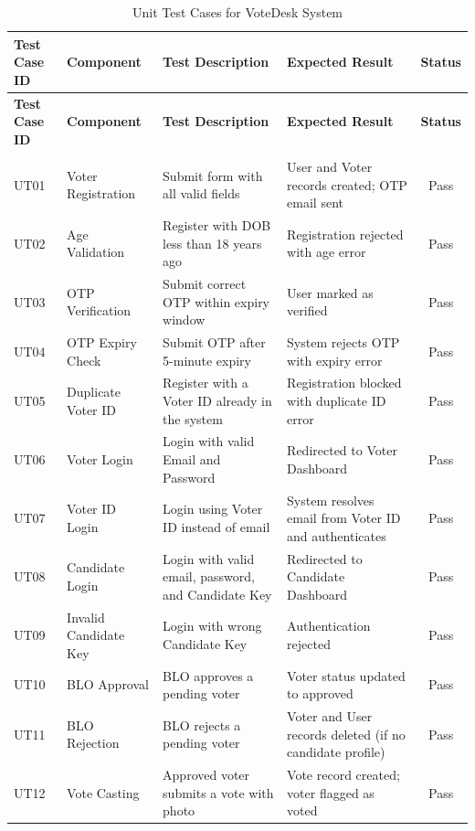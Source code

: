 \begin{longtable}{|p{1.5cm}|p{2.5cm}|p{4cm}|p{4cm}|c|}
\hline
\textbf{Test Case ID} & \textbf{Component} & \textbf{Test Description} & \textbf{Expected Result} & \textbf{Status} \\
\hline
\endfirsthead

\hline
\textbf{Test Case ID} & \textbf{Component} & \textbf{Test Description} & \textbf{Expected Result} & \textbf{Status} \\
\hline
\endhead

\hline
\caption{Unit Test Cases for VoteDesk System} \label{tab:unit_tests} \\
\endlastfoot

UT01 & Voter Registration & Submit form with all valid fields & User and Voter records created; OTP email sent & Pass \\
\hline
UT02 & Age Validation & Register with DOB less than 18 years ago & Registration rejected with age error & Pass \\
\hline
UT03 & OTP Verification & Submit correct OTP within expiry window & User marked as verified & Pass \\
\hline
UT04 & OTP Expiry Check & Submit OTP after 5-minute expiry & System rejects OTP with expiry error & Pass \\
\hline
UT05 & Duplicate Voter ID & Register with a Voter ID already in the system & Registration blocked with duplicate ID error & Pass \\
\hline
UT06 & Voter Login & Login with valid Email and Password & Redirected to Voter Dashboard & Pass \\
\hline
UT07 & Voter ID Login & Login using Voter ID instead of email & System resolves email from Voter ID and authenticates & Pass \\
\hline
UT08 & Candidate Login & Login with valid email, password, and Candidate Key & Redirected to Candidate Dashboard & Pass \\
\hline
UT09 & Invalid Candidate Key & Login with wrong Candidate Key & Authentication rejected & Pass \\
\hline
UT10 & BLO Approval & BLO approves a pending voter & Voter status updated to approved & Pass \\
\hline
UT11 & BLO Rejection & BLO rejects a pending voter & Voter and User records deleted (if no candidate profile) & Pass \\
\hline
UT12 & Vote Casting & Approved voter submits a vote with photo & Vote record created; voter flagged as voted & Pass \\

\end{longtable}
